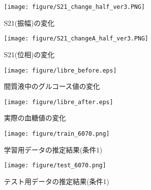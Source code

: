 \documentclass[11pt,a4paper,uplatex,draft]{ujarticle}
\begin{document}
\begin{figure}[htbp]
    \begin{minipage}{0.5\hsize}
        \begin{center}
            \texttt{[image: figure/S21\_change\_half\_ver3.PNG]}
        \end{center}
        \caption{S21(振幅)の変化}
        \label{fig:S21MA}
    \end{minipage}
    \begin{minipage}{0.5\hsize}
        \begin{center}
            \texttt{[image: figure/S21\_changeA\_half\_ver3.PNG]}
        \end{center}
        \caption{S21(位相)の変化}
        \label{fig:S21AA}
    \end{minipage}
\end{figure}

\begin{figure}[htbp]
     \begin{minipage}{0.5\hsize}
         \begin{center}
             \texttt{[image: figure/libre\_before.eps]}
         \end{center}
         \caption{間質液中のグルコース値の変化}
         \label{fig:glu}
     \end{minipage}
     \begin{minipage}{0.5\hsize}
         \begin{center}
             \texttt{[image: figure/libre\_after.eps]}
         \end{center}
         \caption{実際の血糖値の変化}
         \label{fig:glu10}
     \end{minipage}
\end{figure}

\begin{figure}[htbp]
     \begin{minipage}{0.5\hsize}
         \begin{center}
             \texttt{[image: figure/train\_6070.png]}
         \end{center}
         \caption{学習用データの推定結果(条件1)}
         \label{fig:train1}
     \end{minipage}
     \begin{minipage}{0.5\hsize}
         \begin{center}
             \texttt{[image: figure/test\_6070.png]}
         \end{center}
         \caption{テスト用データの推定結果(条件1)}
         \label{fig:test1}
     \end{minipage}
\end{figure}
\end{document}
